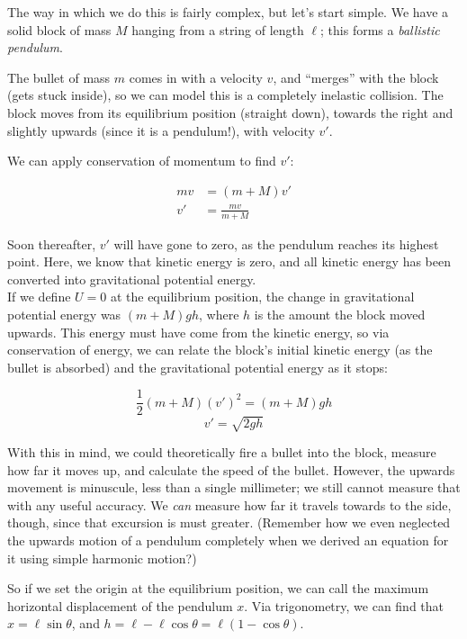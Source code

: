 The way in which we do this is fairly complex, but let's start simple. We have a solid block of mass $M$ hanging from a string of length $\ell$; this forms a \emph{ballistic pendulum}.

The bullet of mass $m$ comes in with a velocity $v$, and ``merges'' with the block (gets stuck inside), so we can model this is a completely inelastic collision. The block moves from its equilibrium position (straight down), towards the right and slightly upwards (since it is a pendulum!), with velocity $v'$.

We can apply conservation of momentum to find $v'$:

\begin{align}
m v &= (m + M) v'\\
v' &= \frac	{m v}{m + M}
\end{align}

Soon thereafter, $v'$ will have gone to zero, as the pendulum reaches its highest point. Here, we know that kinetic energy is zero, and all kinetic energy has been converted into gravitational potential energy.\\
If we define $U = 0$ at the equilibrium position, the change in gravitational potential energy was $(m + M) g h$, where $h$ is the amount the block moved upwards. This energy must have come from the kinetic energy, so via conservation of energy, we can relate the block's initial kinetic energy (as the bullet is absorbed) and the gravitational potential energy as it stops:

\begin{equation}
\frac{1}{2} (m + M) (v')^2 = (m + M) g h
\end{equation}
\begin{equation}
v' = \sqrt{2 g h}
\end{equation}

With this in mind, we could theoretically fire a bullet into the block, measure how far it moves up, and calculate the speed of the bullet. However, the upwards movement is minuscule, less than a single millimeter; we still cannot measure that with any useful accuracy. We \emph{can} measure how far it travels towards to the side, though, since that excursion is must greater. (Remember how we even neglected the upwards motion of a pendulum completely when we derived an equation for it using simple harmonic motion?)

So if we set the origin at the equilibrium position, we can call the maximum horizontal displacement of the pendulum $x$. Via trigonometry, we can find that $x = \ell \sin \theta$, and $h = \ell - \ell \cos \theta = \ell(1 - \cos \theta)$.

